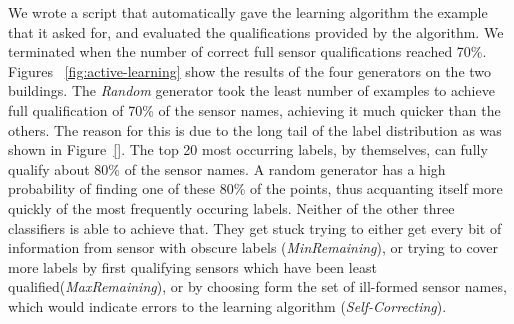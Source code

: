 We wrote a script that automatically gave the learning algorithm the example that it asked for, and evaluated the qualifications provided by the algorithm. We terminated when the number of correct full sensor qualifications reached 70\%. Figures ~\ref{fig:active-learning} show the results of the four generators on the two buildings. The \emph{Random} generator took the least number of examples to achieve full qualification of 70\% of the sensor names, achieving it much quicker than the others. The reason for this is due to the long tail of the label distribution as was shown in Figure~\ref{}. The top 20 most occurring labels, by themselves, can fully qualify about 80\% of the sensor names. A random generator has a high probability of finding one of these 80\% of the points, thus acquanting itself more quickly of the most frequently occuring labels. Neither of the other three classifiers is able to achieve that. They get stuck trying to either get every bit of information from sensor with obscure labels (\emph{MinRemaining}), or trying to cover more labels by first qualifying sensors which have been least qualified(\emph{MaxRemaining}), or by choosing form the set of ill-formed sensor names, which would indicate errors to the learning algorithm (\emph{Self-Correcting}).

